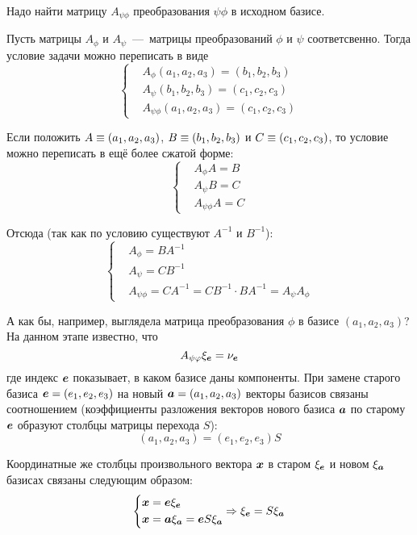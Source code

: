 \documentclass[a4paper,12pt]{article}
\begin{document}
  Надо найти матрицу $A_{\psi\phi}$ преобразования $\psi\phi$ в исходном базисе.
  
  \begin{solution}
    Пусть матрицы $A_{\phi}$ и $A_{\psi}$~---~матрицы преобразований $\phi$ и $\psi$ соответсвенно.
    Тогда условие задачи можно переписать в виде
    \[
      \left\{
        \begin{aligned}
          &A_{\phi} (a_1, a_2, a_3) = (b_1, b_2, b_3)\\
          &A_{\psi} (b_1, b_2, b_3) = (c_1, c_2, c_3)\\
          &A_{\psi\phi} (a_1, a_2, a_3) = (c_1, c_2, c_3)
        \end{aligned}
      \right.
    \]
    
    Если положить $A \hm\equiv (a_1, a_2, a_3)$, $B \hm\equiv (b_1, b_2, b_3)$ и $C \hm\equiv (c_1, c_2, c_3)$, то условие можно переписать в ещё более сжатой форме:
    \[
      \left\{
        \begin{aligned}
          &A_{\phi} A = B\\
          &A_{\psi} B = C\\
          &A_{\psi\phi} A = C
        \end{aligned}
      \right.
    \]
    
    Отсюда (так как по условию существуют $A^{-1}$ и $B^{-1}$):
    \[
      \left\{
        \begin{aligned}
          &A_{\phi} = B A^{-1}\\
          &A_{\psi} = C B^{-1}\\
          &A_{\psi \phi} = C A^{-1} = CB^{-1} \cdot B A^{-1} = A_{\psi} A_{\phi}
        \end{aligned}
      \right.
    \]
    
    А как бы, например, выглядела матрица преобразования $\phi$ в базисе $(a_1, a_2, a_3)$?
    На данном этапе известно, что
    \[
      A_{\psi\varphi} \xi_{\boldsymbol e} = \nu_{\boldsymbol e}
    \]
    где индекс $\boldsymbol e$ показывает, в каком базисе даны компоненты.
    При замене старого базиса $\bds e \hm= (e_1, e_2, e_3)$ на новый $\bds a \hm= (a_1, a_2, a_3)$ векторы базисов связаны соотношением (коэффициенты разложения векторов нового базиса $\boldsymbol a$ по старому $\boldsymbol e$ образуют столбцы матрицы перехода $S$):
    \[
      (a_1, a_2, a_3) = (e_1, e_2, e_3) S
    \]
    
    Координатные же столбцы произвольного вектора $\boldsymbol x$ в старом $\xi_{\boldsymbol e}$ и новом $\xi_{\boldsymbol a}$ базисах связаны следующим образом:
    \[
      \left\{
        \begin{aligned}
          &\boldsymbol x = \boldsymbol e \xi_{\boldsymbol e}\\
          &\boldsymbol x = \boldsymbol a \xi_{\boldsymbol a} = \boldsymbol e S \xi_{\boldsymbol a}\\
        \end{aligned}
        \Rightarrow \xi_{\boldsymbol e} = S \xi_{\boldsymbol a}
      \right.
    \]
    

\end{solution}
\end{document}
